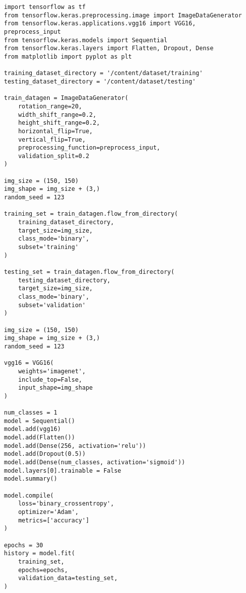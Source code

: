 \begin{verbatim}
import tensorflow as tf
from tensorflow.keras.preprocessing.image import ImageDataGenerator
from tensorflow.keras.applications.vgg16 import VGG16, preprocess_input
from tensorflow.keras.models import Sequential
from tensorflow.keras.layers import Flatten, Dropout, Dense
from matplotlib import pyplot as plt

training_dataset_directory = '/content/dataset/training'
testing_dataset_directory = '/content/dataset/testing'

train_datagen = ImageDataGenerator(
    rotation_range=20,
    width_shift_range=0.2,
    height_shift_range=0.2,
    horizontal_flip=True,
    vertical_flip=True,
    preprocessing_function=preprocess_input,
    validation_split=0.2
)

img_size = (150, 150)
img_shape = img_size + (3,)
random_seed = 123

training_set = train_datagen.flow_from_directory(
    training_dataset_directory,
    target_size=img_size,
    class_mode='binary',
    subset='training'
)

testing_set = train_datagen.flow_from_directory(
    testing_dataset_directory,
    target_size=img_size,
    class_mode='binary',
    subset='validation'
)

img_size = (150, 150)
img_shape = img_size + (3,)
random_seed = 123

vgg16 = VGG16(
    weights='imagenet',
    include_top=False,
    input_shape=img_shape
)

num_classes = 1
model = Sequential()
model.add(vgg16)
model.add(Flatten())
model.add(Dense(256, activation='relu'))
model.add(Dropout(0.5))
model.add(Dense(num_classes, activation='sigmoid'))
model.layers[0].trainable = False
model.summary()

model.compile(
    loss='binary_crossentropy',
    optimizer='Adam',
    metrics=['accuracy']
)

epochs = 30
history = model.fit(
    training_set,
    epochs=epochs,
    validation_data=testing_set,
)
\end{verbatim}
